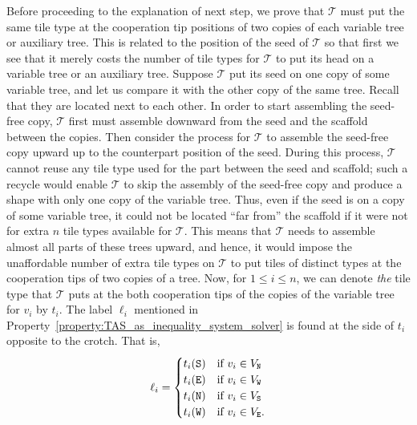 \documentclass{article}
\theoremstyle{remark}
\theoremstyle{definition}
\newcommand{\tas}{\ensuremath{\mathcal{T}}}
\newcommand{\north}{{\tt N}}
\newcommand{\west}{{\tt W}}
\newcommand{\south}{{\tt S}}
\newcommand{\east}{{\tt E}}
\begin{document}
Before proceeding to the explanation of next step, we prove that $\tas$ must put the same tile type at the cooperation tip positions of two copies of each variable tree or auxiliary tree. 
This is related to the position of the seed of $\tas$ so that first we see that it merely costs the number of tile types for $\tas$ to put its head on a variable tree or an auxiliary tree. 
Suppose $\tas$ put its seed on one copy of some variable tree, and let us compare it with the other copy of the same tree. 
Recall that they are located next to each other. 
In order to start assembling the seed-free copy, $\tas$ first must assemble downward from the seed and the scaffold between the copies. 
Then consider the process for $\tas$ to assemble the seed-free copy upward up to the counterpart position of the seed.
During this process, $\tas$ cannot reuse any tile type used for the part between the seed and scaffold; such a recycle would enable $\tas$ to skip the assembly of the seed-free copy and produce a shape with only one copy of the variable tree. 
Thus, even if the seed is on a copy of some variable tree, it could not be located ``far from'' the scaffold if it were not for extra $n$ tile types available for $\tas$. 
This means that $\tas$ needs to assemble almost all parts of these trees upward, and hence, it would impose the unaffordable number of extra tile types on $\tas$ to put tiles of distinct types at the cooperation tips of two copies of a tree. 
Now, for $1 \le i \le n$, we can denote {\it the} tile type that $\tas$ puts at the both cooperation tips of the copies of the variable tree for $v_i$ by $t_i$. 
The label $\ell_i$ mentioned in Property~\ref{property:TAS_as_inequality_system_solver} is found at the side of $t_i$ opposite to the crotch. 
That is, 
\[
	\ell_i = 
	\begin{cases}
	t_i(\south) & \text{if $v_i \in V_\north$} \\
	t_i(\east)  & \text{if $v_i \in V_\west$} \\
	t_i(\north) & \text{if $v_i \in V_\south$} \\
	t_i(\west)  & \text{if $v_i \in V_\east$}. 
	\end{cases}
\]

\end{document}
